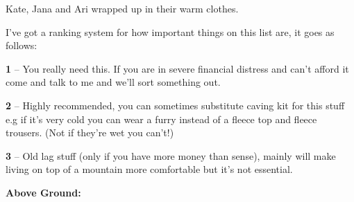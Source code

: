 \begin{marginfigure}
\checkoddpage \ifoddpage \forcerectofloat \else \forceversofloat \fi
\centering
 \caption{Kate, Jana and Ari wrapped up in their warm clothes. }
 \label{warm gear}
\end{marginfigure}


I’ve got a ranking system for how important things on this list are, it goes as follows:

\textbf{1} – You really need this. If you are in severe financial distress and can’t afford it come and talk to me and we’ll sort something out.

\textbf{2} – Highly recommended, you can sometimes substitute caving kit for this stuff e.g if it’s very cold you can wear a furry instead of a fleece top and fleece trousers. (Not if they're wet you can't!)

\textbf{3} – Old lag stuff (only if you have more money than sense), mainly will make living on top of a mountain more comfortable but it’s not essential.

\newpage

\textbf{Above Ground:}

